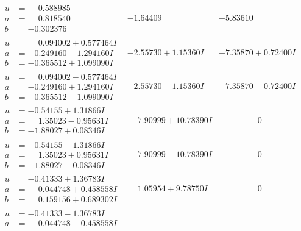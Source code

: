 \documentclass[1p]{elsarticle_modified}
\theoremstyle{definition}
\begin{document}
$$\begin{array}{c|c|c}
 \hline 
\begin{aligned}
u &= \phantom{-}0.588985\phantom{ +0.000000I} \\
a &= \phantom{-}0.818540\phantom{ +0.000000I} \\
b &= -0.302376\phantom{ +0.000000I}\end{aligned}
 & -1.64409\phantom{ +0.000000I} & -5.83610\phantom{ +0.000000I} \\ \hline\begin{aligned}
u &= \phantom{-}0.094002 + 0.577464 I \\
a &= -0.249160 - 1.294160 I \\
b &= -0.365512 + 1.099090 I\end{aligned}
 & -2.55730 + 1.15360 I & -7.35870 + 0.72400 I \\ \hline\begin{aligned}
u &= \phantom{-}0.094002 - 0.577464 I \\
a &= -0.249160 + 1.294160 I \\
b &= -0.365512 - 1.099090 I\end{aligned}
 & -2.55730 - 1.15360 I & -7.35870 - 0.72400 I \\ \hline\begin{aligned}
u &= -0.54155 + 1.31866 I \\
a &= \phantom{-}1.35023 - 0.95631 I \\
b &= -1.88027 + 0.08346 I\end{aligned}
 & \phantom{-}7.90999 + 10.78390 I & \phantom{-0.000000 } 0 \\ \hline\begin{aligned}
u &= -0.54155 - 1.31866 I \\
a &= \phantom{-}1.35023 + 0.95631 I \\
b &= -1.88027 - 0.08346 I\end{aligned}
 & \phantom{-}7.90999 - 10.78390 I & \phantom{-0.000000 } 0 \\ \hline\begin{aligned}
u &= -0.41333 + 1.36783 I \\
a &= \phantom{-}0.044748 + 0.458558 I \\
b &= \phantom{-}0.159156 + 0.689302 I\end{aligned}
 & \phantom{-}1.05954 + 9.78750 I & \phantom{-0.000000 } 0 \\ \hline\begin{aligned}
u &= -0.41333 - 1.36783 I \\
a &= \phantom{-}0.044748 - 0.458558 I \\

\end{aligned}
\end{array}$$
\end{document}
